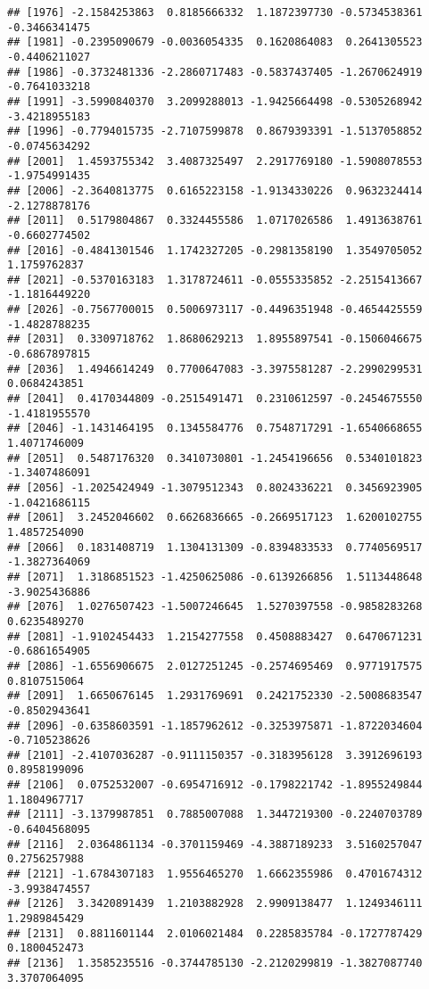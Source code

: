 \documentclass[
]{article}
\begin{document}
\begin{verbatim}
## [1976] -2.1584253863  0.8185666332  1.1872397730 -0.5734538361 -0.3466341475
## [1981] -0.2395090679 -0.0036054335  0.1620864083  0.2641305523 -0.4406211027
## [1986] -0.3732481336 -2.2860717483 -0.5837437405 -1.2670624919 -0.7641033218
## [1991] -3.5990840370  3.2099288013 -1.9425664498 -0.5305268942 -3.4218955183
## [1996] -0.7794015735 -2.7107599878  0.8679393391 -1.5137058852 -0.0745634292
## [2001]  1.4593755342  3.4087325497  2.2917769180 -1.5908078553 -1.9754991435
## [2006] -2.3640813775  0.6165223158 -1.9134330226  0.9632324414 -2.1278878176
## [2011]  0.5179804867  0.3324455586  1.0717026586  1.4913638761 -0.6602774502
## [2016] -0.4841301546  1.1742327205 -0.2981358190  1.3549705052  1.1759762837
## [2021] -0.5370163183  1.3178724611 -0.0555335852 -2.2515413667 -1.1816449220
## [2026] -0.7567700015  0.5006973117 -0.4496351948 -0.4654425559 -1.4828788235
## [2031]  0.3309718762  1.8680629213  1.8955897541 -0.1506046675 -0.6867897815
## [2036]  1.4946614249  0.7700647083 -3.3975581287 -2.2990299531  0.0684243851
## [2041]  0.4170344809 -0.2515491471  0.2310612597 -0.2454675550 -1.4181955570
## [2046] -1.1431464195  0.1345584776  0.7548717291 -1.6540668655  1.4071746009
## [2051]  0.5487176320  0.3410730801 -1.2454196656  0.5340101823 -1.3407486091
## [2056] -1.2025424949 -1.3079512343  0.8024336221  0.3456923905 -1.0421686115
## [2061]  3.2452046602  0.6626836665 -0.2669517123  1.6200102755  1.4857254090
## [2066]  0.1831408719  1.1304131309 -0.8394833533  0.7740569517 -1.3827364069
## [2071]  1.3186851523 -1.4250625086 -0.6139266856  1.5113448648 -3.9025436886
## [2076]  1.0276507423 -1.5007246645  1.5270397558 -0.9858283268  0.6235489270
## [2081] -1.9102454433  1.2154277558  0.4508883427  0.6470671231 -0.6861654905
## [2086] -1.6556906675  2.0127251245 -0.2574695469  0.9771917575  0.8107515064
## [2091]  1.6650676145  1.2931769691  0.2421752330 -2.5008683547 -0.8502943641
## [2096] -0.6358603591 -1.1857962612 -0.3253975871 -1.8722034604 -0.7105238626
## [2101] -2.4107036287 -0.9111150357 -0.3183956128  3.3912696193  0.8958199096
## [2106]  0.0752532007 -0.6954716912 -0.1798221742 -1.8955249844  1.1804967717
## [2111] -3.1379987851  0.7885007088  1.3447219300 -0.2240703789 -0.6404568095
## [2116]  2.0364861134 -0.3701159469 -4.3887189233  3.5160257047  0.2756257988
## [2121] -1.6784307183  1.9556465270  1.6662355986  0.4701674312 -3.9938474557
## [2126]  3.3420891439  1.2103882928  2.9909138477  1.1249346111  1.2989845429
## [2131]  0.8811601144  2.0106021484  0.2285835784 -0.1727787429  0.1800452473
## [2136]  1.3585235516 -0.3744785130 -2.2120299819 -1.3827087740  3.3707064095

\end{verbatim}
\end{document}
